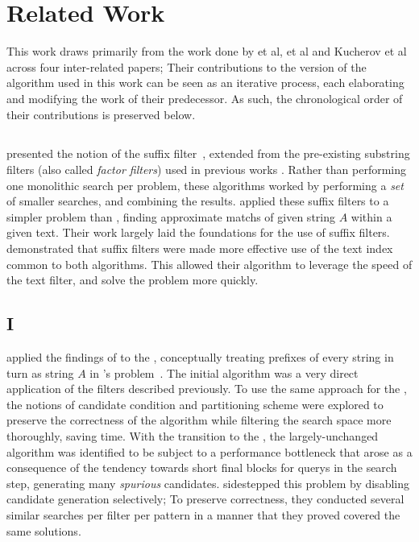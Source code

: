 \chapter{Related Work}

This work draws primarily from the work done by \kark{} et al,  \vali{} et al and Kucherov et al across four inter-related papers; Their contributions to the version of the algorithm used in this work can be seen as an iterative process, each elaborating and modifying the work of their predecessor. As such, the chronological order of their contributions is preserved below.

\section{\kark{}}

\kark{} presented the notion of the \gls{suffix filter}~\cite{kark2007}, extended from the pre-existing substring filters (also called \textit{factor filters}) used in previous works \cite{substring_myers} \cite{substring_yates}. Rather than performing one monolithic search per problem, these algorithms worked by performing a \textit{set} of smaller searches, and combining the results. \kark{} applied these suffix filters to a simpler problem than \aspop, finding \glspl{approximate match} of given string $A$ within a given \gls{text}. Their work largely laid the foundations for the use of suffix filters. \kark{} demonstrated that suffix filters were made more effective use of the \gls{text index} common to both algorithms. This allowed their algorithm to leverage the speed of the text filter, and solve the problem more quickly.

\section{\vali{} I}

\vali{} applied the findings of \kark{} to the \aspop{}, conceptually treating prefixes of every string in turn as string $A$ in \kark{}'s problem~\cite{vali2010}. The initial algorithm was a very direct application of the \glspl{filter} described previously. To use the same approach for the \aspop{}, the notions of \gls{candidate condition} and \gls{partitioning scheme} were explored to preserve the correctness of the algorithm while filtering the search space more thoroughly, saving time. With the transition to the \aspop{}, the largely-unchanged algorithm was identified to be subject to a performance bottleneck that arose as a consequence of the tendency towards short final \glspl{block} for \glspl{query} in the \gls{search step}, generating many \textit{spurious} candidates. \vali{} sidestepped this problem by disabling candidate generation selectively; To preserve correctness, they conducted several similar searches per \gls{filter} per pattern in a manner that they proved covered the same solutions.

